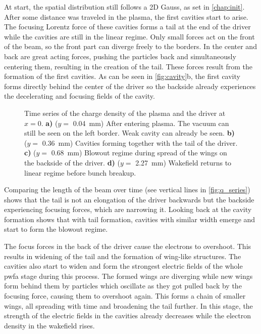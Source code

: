 \documentclass[bachelor_thesis]{subfiles}
\begin{document}
At start, the spatial distribution still follows a 2D Gauss, as set in \autoref{chap:init}. After some distance was traveled in the plasma, the first cavities start to arise. The focusing Lorentz force of these cavities forms a tail at the end of the driver while the cavities are still in the linear regime.
Only small forces act on the front of the beam, so the front part can diverge freely to the borders. In the center and back are great acting forces, pushing the particles back and simultaneously centering them, resulting in the creation of the tail.
These forces result from the formation of the first cavities. As can be seen in \autoref{fig:cavity}b, the first cavity forms directly behind the center of the driver so the backside already experiences the decelerating and focusing fields of the cavity.
\begin{figure}
	\centering
	
	\caption{Time series of the charge density of the plasma and the driver at $x=0$.
	\textbf{a)} ($y=$ \qty{0.04}{mm}) After entering plasma. The vacuum can still be seen on the left border. Weak cavity can already be seen.
	\textbf{b)} ($y=$ \qty{0.36}{mm}) Cavities forming together with the tail of the driver.
	\textbf{c)} ($y=$ \qty{0.68}{mm}) Blowout regime during spread of the wings on the backside of the driver.
	\textbf{d)} ($y=$ \qty{2.27}{mm}) Wakefield returns to linear regime before bunch breakup.}
	\label{fig:cavity}
\end{figure}
Comparing the length of the beam over time (see vertical lines in \autoref{fig:q_series}) shows that the tail is not an elongation of the driver backwards but the backside experiencing focusing forces, which are narrowing it.
Looking back at the cavity formation shows that with tail formation, cavities with similar width emerge and start to form the blowout regime.

The focus forces in the back of the driver cause the electrons to overshoot. This results in widening of the tail and the formation of wing-like structures. The cavities also start to widen and form the strongest electric fields of the whole \gls{pwfa} stage during this process.
The formed wings are diverging while new wings form behind them by particles which oscillate as they got pulled back by the focusing force, causing them to overshoot again. This forms a chain of smaller wings, all spreading with time and broadening the tail further.
In this stage, the strength of the electric fields in the cavities already decreases while the electron density in the wakefield rises.
\end{document}
